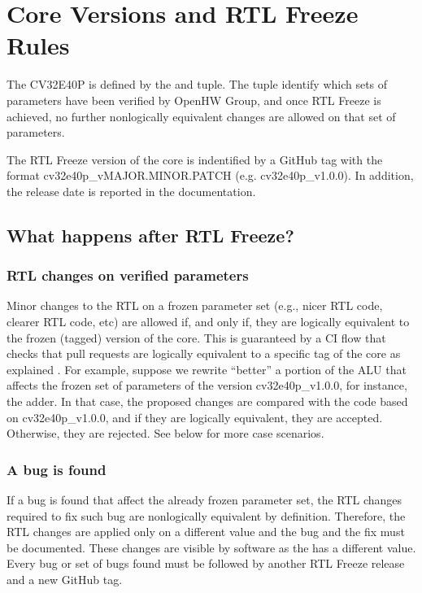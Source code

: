 \documentclass[letterpaper,10pt,english]{sphinxmanual}
\begin{document}
\chapter{Core Versions and RTL Freeze Rules}
\label{\detokenize{core_versions:core-versions-and-rtl-freeze-rules}}\label{\detokenize{core_versions:core-versions}}\label{\detokenize{core_versions::doc}}
\sphinxAtStartPar
The CV32E40P is defined by the  and  tuple.
The tuple identify which sets of parameters have been verified
by OpenHW Group, and once RTL Freeze is achieved, no further
non\sphinxhyphen{}logically equivalent changes are allowed on that set of parameters.

\sphinxAtStartPar
The RTL Freeze version of the core is indentified by a GitHub
tag with the format cv32e40p\_vMAJOR.MINOR.PATCH (e.g. cv32e40p\_v1.0.0).
In addition, the release date is reported in the documentation.


\section{What happens after RTL Freeze?}
\label{\detokenize{core_versions:what-happens-after-rtl-freeze}}

\subsection{RTL changes on verified parameters}
\label{\detokenize{core_versions:rtl-changes-on-verified-parameters}}
\sphinxAtStartPar
Minor changes to the RTL on a frozen parameter set (e.g., nicer RTL code, clearer RTL code, etc) are allowed if, and only if, they are logically equivalent to the frozen (tagged) version of the core.
This is guaranteed by a CI flow that checks that pull requests are logically equivalent to a specific tag of the core as
explained .
For example, suppose we re\sphinxhyphen{}write “better” a portion of the ALU that affects the frozen set of parameters of the version cv32e40p\_v1.0.0,
for instance, the adder. In that case, the proposed changes are compared with the code based on cv32e40p\_v1.0.0, and if they are logically equivalent, they are accepted. Otherwise, they are rejected. See below for more case scenarios.


\subsection{A bug is found}
\label{\detokenize{core_versions:a-bug-is-found}}
\sphinxAtStartPar
If a bug is found that affect the already frozen parameter set,
the RTL changes required to fix such bug are non\sphinxhyphen{}logically equivalent by definition.
Therefore, the RTL changes are applied only on a different  
value and the bug and the fix must be documented.
These changes are visible by software as the  has a different value.
Every bug or set of bugs found must be followed by another RTL Freeze release and a new GitHub tag.
\end{document}
